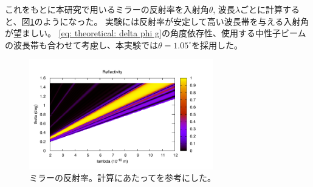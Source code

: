 \documentclass[dvipdfmx]{jsarticle}
\begin{document}
これをもとに本研究で用いるミラーの反射率を入射角$\theta$, 波長$\lambda$ごとに計算すると、図\ref{fig: theoretical: reflectivity calculated}のようになった。
実験には反射率が安定して高い波長帯を与える入射角が望ましい。
\eqref{eq: theoretical: delta phi g}の角度依存性、使用する中性子ビームの波長帯も合わせて考慮し、本実験では$\theta=1.05^\circ$を採用した。

\begin{figure}
    \centering
    \includegraphics[width=8cm]{./img/reflNiTi2d.pdf}
    \caption{ミラーの反射率。計算にあたって\cite{SekY:2011}を参考にした。}
    \label{fig: theoretical: reflectivity calculated}
\end{figure}
\end{document}
